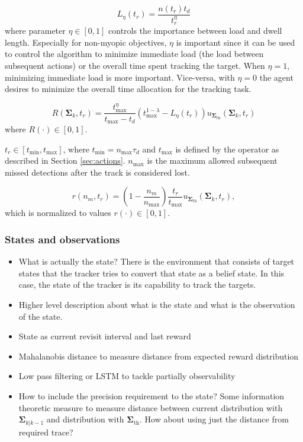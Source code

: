 \documentclass[english, 12pt, a4paper, elec, utf8, a-1b, online]{aaltothesis}
\newcommand{\priorecov}{\boldsymbol{\Sigma}_{k|k-1}}
\newcommand{\ecov}{\boldsymbol{\Sigma}_k}
\newcommand{\tmax}{t_\text{max}}
\newcommand{\tmin}{t_\text{min}}
\newcommand{\nmax}{n_\text{max}}
\newcommand{\priorecovth}{\bm{\Sigma}_{\text{th}}}
\begin{document}
\begin{equation}\label{eq:utility}
    L_\eta(t_r) = \frac{n(t_r) t_d}{t_r^\eta}
\end{equation}
where parameter $\eta \in [0, 1]$ controls the importance between load and dwell length.
Especially for non-myopic objectives, $\eta$ is important since it can be used to control the algorithm to minimize immediate load (the load between subsequent actions) or the overall time spent tracking the target.
When $\eta=1$, minimizing immediate load is more important. 
Vice-versa, with $\eta=0$ the agent desires to minimize the overall time allocation for the tracking task.

\begin{equation}
    R(\ecov, t_r) = \frac{\tmax^\eta}{\tmax - t_d} \left( \tmax^{1-\lambda} - L_\eta(t_r) \right) u_{\priorecovth} (\ecov, t_r)
\end{equation}
where $R(\cdot) \in [0, 1]$.

$t_r \in [ \tmin, \tmax ]$, where $\tmin = \nmax \tau_d$ and $\tmax$ is defined by the operator as described in Section \ref{sec:actions}.
$\nmax$ is the maximum allowed subsequent missed detections after the track is considered lost.

\begin{equation}
    r(n_m, t_r) = (1 - \frac{n_m}{\nmax}) \frac{t_r}{\tmax} u_{\priorecovth} (\ecov, t_r),
\end{equation}
which is normalized to values $r(\cdot) \in [0, 1]$.

\subsubsection{States and observations}

\begin{itemize}
    \item What is actually the state? There is the environment that consists of target states that the tracker tries to convert that state as a belief state. In this case, the state of the tracker is its capability to track the targets.
    \item Higher level description about what is the state and what is the observation of the state.
    \item State as current revisit interval and last reward
    \item Mahalanobis distance to measure distance from expected reward distribution
    \item Low pass filtering or LSTM to tackle partially observability
    \item How to include the precision requirement to the state? Some information theoretic measure to measure distance between current distribution with $\priorecov$ and distribution with $\priorecovth$. How about using just the distance from required trace?
\end{itemize}
\end{document}
